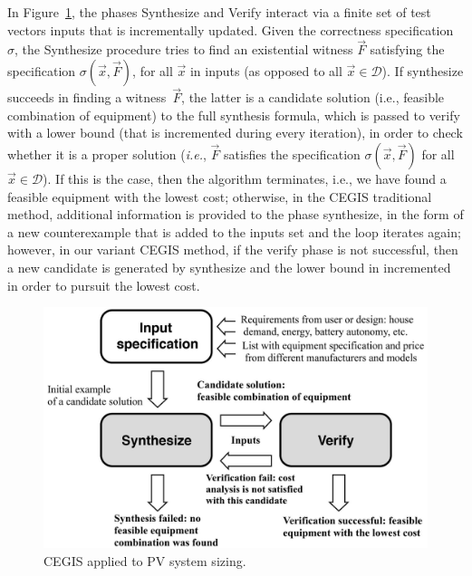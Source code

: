 \documentclass[review]{elsarticle}
\begin{document}
In Figure~\ref{Counter-Example-Guided-Inductive-Synthesis}, the phases {\sc Synthesize} and {\sc Verify} interact via a finite set of test vectors {\sc inputs} that is incrementally updated. Given the correctness specification $\sigma$, the {\sc Synthesize} procedure tries to find an existential witness $\vec{F}$ satisfying the specification $\sigma(\vec{x}, \vec{F})$, for all $\vec{x}$ in {\sc inputs} (as opposed to all $\vec{x} \in \mathcal{D}$). If {\sc synthesize} succeeds in finding a witness~$\vec{F}$, the latter is a candidate solution (i.e., feasible combination of equipment) to the full synthesis formula, which is passed to {\sc verify} with a lower bound (that is incremented during every iteration), in order to check whether it is a proper solution ({\it i.e.}, $\vec{F}$ satisfies the specification $\sigma(\vec{x}, \vec{F})$ for all $\vec{x}\in\mathcal{D}$). If this is the case, then the algorithm terminates, i.e., we have found a feasible equipment with the lowest cost; otherwise, in the CEGIS traditional method, additional information is provided to the phase {\sc synthesize}, in the form of a new counterexample that is added to the {\sc inputs} set and the loop iterates again; however, in our variant CEGIS method, if the {\sc verify} phase is not successful, then a new candidate is generated by {\sc synthesize} and the lower bound in incremented in order to pursuit the lowest cost.
%
\begin{figure}[h]
	\centering
	\includegraphics[width=0.75\columnwidth]{fig2_rev.jpg}
	\caption{CEGIS applied to PV system sizing.}
	\label{Counter-Example-Guided-Inductive-Synthesis}
\end{figure}
%
\end{document}
